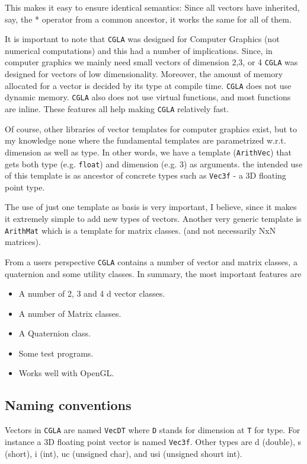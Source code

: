 \documentclass[a4paper]{article}
\begin{document}
This makes it easy to ensure identical semantics: Since all vectors
have inherited, say, the * operator from a common ancestor, it works
the same for all of them.

It is important to note that \texttt{CGLA} was designed for Computer Graphics 
(not numerical computations) and this had a number of
implications. Since, in computer graphics we mainly need small vectors
of dimension 2,3, or 4 \texttt{CGLA} was designed for vectors of low
dimensionality. Moreover, the amount of memory allocated for a vector
is decided by its type at compile time. \texttt{CGLA} does not use dynamic
memory. \texttt{CGLA} also does not use virtual functions, and most functions
are inline. These features all help making \texttt{CGLA} relatively fast. 

Of course, other libraries of vector templates for computer graphics
exist, but to my knowledge none where the fundamental templates are
parametrized w.r.t. dimension as well as type. In other words, we have
a template (\texttt{ArithVec}) that gets both type
(e.g. \texttt{float}) and dimension 
(e.g. 3) as arguments. the intended use of this template is as
ancestor of concrete types such as \texttt{Vec3f} - a 3D floating
point type. 

The use of just one template as basis is very important, I believe,
since it makes it extremely simple to add new types of
vectors. Another very generic template is \texttt{ArithMat} which is a
template for matrix classes. (and not necessarily NxN matrices). 

From a users perspective \texttt{CGLA} contains a number of vector and matrix
classes, a quaternion and some utility classes. In summary, the most
important features are
\begin{itemize}
\item A number of 2, 3 and 4 d vector classes.
\item A number of Matrix classes.
\item A Quaternion class.
\item Some test programs.
\item Works well with OpenGL.
\end{itemize}


\subsection{Naming conventions}

Vectors in \texttt{CGLA} are named \texttt{VecDT} where \texttt{D} stands for
dimension at  \texttt{T} 
for type. For instance a 3D floating point vector is named
\texttt{Vec3f}. Other types are d (double), s (short), i (int), uc
(unsigned char), and usi (unsigned shourt int).
\end{document}
